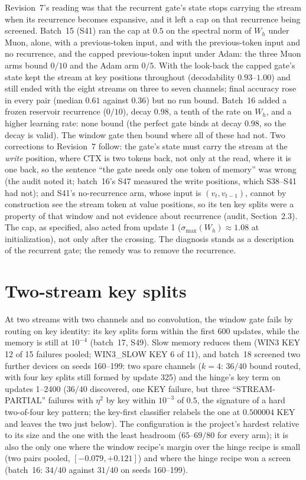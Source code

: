 \documentclass[11pt]{article}
\newcommand{\arm}[1]{\textsf{#1}}
\begin{document}
Revision~7's reading was that the recurrent gate's state stops carrying the stream when its recurrence becomes expansive, and it left a cap on that recurrence being screened. Batch~15 (S41) ran the cap at $0.5$ on the spectral norm of $W_h$ under Muon, alone, with a previous-token input, and with the previous-token input and no recurrence, and the capped previous-token input under Adam: the three Muon arms bound $0/10$ and the Adam arm $0/5$. With the look-back the capped gate's state kept the stream at key positions throughout (decodability $0.93$--$1.00$) and still ended with the eight streams on three to seven channels; final accuracy rose in every pair (median $0.61$ against $0.36$) but no run bound. Batch~16 added a frozen reservoir recurrence ($0/10$), decay $0.98$, a tenth of the rate on $W_h$, and a higher learning rate: none bound (the perfect gate binds at decay $0.98$, so the decay is valid). The window gate then bound where all of these had not. Two corrections to Revision~7 follow: the gate's state must carry the stream at the \emph{write} position, where CTX is two tokens back, not only at the read, where it is one back, so the sentence ``the gate needs only one token of memory'' was wrong (the audit noted it; batch~16's S47 measured the write positions, which S38--S41 had not); and S41's no-recurrence arm, whose input is $(v_t, v_{t-1})$, cannot by construction see the stream token at value positions, so its ten key splits were a property of that window and not evidence about recurrence (audit, Section~2.3). The cap, as specified, also acted from update 1 ($\sigma_{\max}(W_h) \approx 1.08$ at initialization), not only after the crossing. The diagnosis stands as a description of the recurrent gate; the remedy was to remove the recurrence.

\section{Two-stream key splits}
\label{sec:keysplits}

At two streams with two channels and no convolution, the window gate fails by routing on key identity: its key splits form within the first 600 updates, while the memory is still at $10^{-4}$ (batch~17, S49). Slow memory reduces them (\arm{WIN3} KEY 12 of 15 failures pooled; \arm{WIN3\_SLOW} KEY 6 of 11), and batch~18 screened two further devices on seeds 160--199: two spare channels ($k = 4$: $36/40$ bound routed, with four key splits still formed by update 325) and the hinge's key term on updates 1--2400 ($36/40$ discovered, one KEY failure, but three ``STREAM-PARTIAL'' failures with $\eta^2$ by key within $10^{-3}$ of $0.5$, the signature of a hard two-of-four key pattern; the key-first classifier relabels the one at $0.500004$ KEY and leaves the two just below). The configuration is the project's hardest relative to its size and the one with the least headroom ($65$--$69/80$ for every arm); it is also the only one where the window recipe's margin over the hinge recipe is small (two pairs pooled, $[-0.079, +0.121]$) and where the hinge recipe won a screen (batch~16: $34/40$ against $31/40$ on seeds 160--199).
\end{document}
